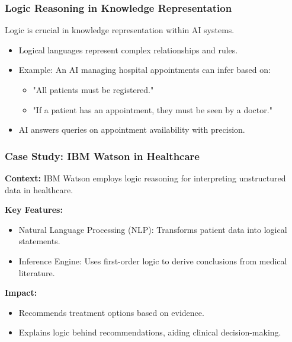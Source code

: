 \documentclass[aspectratio=169]{beamer}
\begin{document}
\begin{frame}[fragile]
    \frametitle{Logic Reasoning in Knowledge Representation}
    Logic is crucial in knowledge representation within AI systems.
    \begin{itemize}
        \item Logical languages represent complex relationships and rules.
        \item Example: An AI managing hospital appointments can infer based on:
        \begin{itemize}
            \item "All patients must be registered."
            \item "If a patient has an appointment, they must be seen by a doctor."
        \end{itemize}
        \item AI answers queries on appointment availability with precision.
    \end{itemize}
\end{frame}

\begin{frame}[fragile]
    \frametitle{Case Study: IBM Watson in Healthcare}
    \textbf{Context:} IBM Watson employs logic reasoning for interpreting unstructured data in healthcare.
    
    \textbf{Key Features:}
    \begin{itemize}
        \item Natural Language Processing (NLP): Transforms patient data into logical statements.
        \item Inference Engine: Uses first-order logic to derive conclusions from medical literature.
    \end{itemize}
    
    \textbf{Impact:}
    \begin{itemize}
        \item Recommends treatment options based on evidence.
        \item Explains logic behind recommendations, aiding clinical decision-making.
    \end{itemize}
\end{frame}
\end{document}

